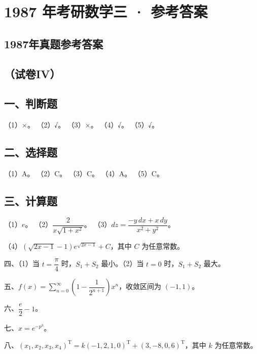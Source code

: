 \documentclass[UTF8,12pt]{ctexart}
\begin{document}
\section*{1987 年考研数学三 · 参考答案}
\subsection*{1987年真题参考答案}

\subsection*{（试卷IV）}

\subsection*{一、判断题}

（1）×。 （2）√。 （3）×。 （4）√。 （5）√。


\subsection*{二、选择题}

（1）A。 （2）C。 （3）C。 （4）A。 （5）C。


\subsection*{三、计算题}

（1）\(\displaystyle e\)。 （2）\(\displaystyle \dfrac{\displaystyle 2}{\displaystyle x\sqrt{1+x^2}}\)。 （3）\(\displaystyle dz=\dfrac{\displaystyle -y\,dx+x\,dy}{\displaystyle x^2+y^2}\)。


（4）\(\displaystyle (\sqrt{2x-1}-1)e^{\sqrt{2x-1}}+C\)，其中 \(\displaystyle C\) 为任意常数。


四、（1）当 \(\displaystyle t=\dfrac{\displaystyle \pi}{\displaystyle 4}\) 时，\(\displaystyle S_1+S_2\) 最小。（2）当 \(\displaystyle t=0\) 时，\(\displaystyle S_1+S_2\) 最大。


五、\(\displaystyle f(x)=\displaystyle \sum_{n=0}^{\infty}\left(1-\dfrac{\displaystyle 1}{\displaystyle 2^{n+1}}\right)x^n\)，收敛区间为 \(\displaystyle (-1,\allowbreak 1)\)。


六、\(\displaystyle \dfrac{\displaystyle e}{\displaystyle 2}-1\)。


七、\(\displaystyle x=e^{-p^3}\)。


八、\(\displaystyle (x_1,\allowbreak x_2,\allowbreak x_3,\allowbreak x_4)^{\mathrm T}=k(-1,\allowbreak 2,\allowbreak 1,\allowbreak 0)^{\mathrm T}+(3,\allowbreak -8,\allowbreak 0,\allowbreak 6)^{\mathrm T}\)，其中 \(\displaystyle k\) 为任意常数。
\end{document}
